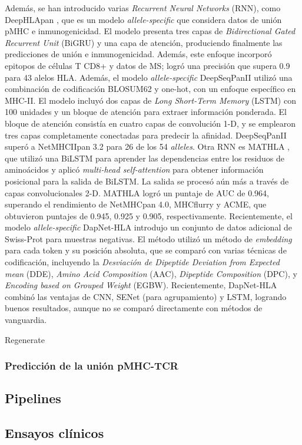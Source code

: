 Además, se han introducido varias \textit{Recurrent Neural Networks} (RNN), como DeepHLApan \citep{wu2019deephlapan}, que es un modelo \textit{allele-specific} que considera datos de unión pMHC e inmunogenicidad. El modelo presenta tres capas de \textit{Bidirectional Gated Recurrent Unit} (BiGRU) y una capa de atención, produciendo finalmente las predicciones de unión e inmunogenicidad. Además, este enfoque incorporó epitopos de células T CD8+ y datos de MS; logró una precisión que supera 0.9 para 43 alelos HLA. Además, el modelo \textit{allele-specific} DeepSeqPanII \citep{liu2021deepseqpanii} utilizó una combinación de codificación BLOSUM62 y one-hot, con un enfoque específico en MHC-II. El modelo incluyó dos capas de \textit{Long Short-Term Memory} (LSTM) con 100 unidades y un bloque de atención para extraer información ponderada. El bloque de atención consistía en cuatro capas de convolución 1-D, y se emplearon tres capas completamente conectadas para predecir la afinidad. DeepSeqPanII superó a NetMHCIIpan 3.2 para 26 de los 54 \textit{alleles}. Otra RNN es MATHLA \citep{ye2021mathla}, que utilizó una BiLSTM para aprender las dependencias entre los residuos de aminoácidos y aplicó \textit{multi-head self-attention} para obtener información posicional para la salida de BiLSTM. La salida se procesó aún más a través de capas convolucionales 2-D. MATHLA logró un puntaje de AUC de 0.964, superando el rendimiento de NetMHCpan 4.0, MHCflurry y ACME, que obtuvieron puntajes de 0.945, 0.925 y 0.905, respectivamente. Recientemente, el modelo \textit{allele-specific} DapNet-HLA \citep{jing2023dapnet} introdujo un conjunto de datos adicional de Swiss-Prot para muestras negativas. El método utilizó un método de \textit{embedding} para cada token y su posición absoluta, que se comparó con varias técnicas de codificación, incluyendo la \textit{Desviación de Dipeptide Deviation from Expected mean} (DDE), \textit{Amino Acid Composition} (AAC), \textit{Dipeptide Composition} (DPC), y \textit{Encoding based on Grouped Weight} (EGBW). Recientemente, DapNet-HLA combinó las ventajas de CNN, SENet (para agrupamiento) y LSTM, logrando buenos resultados, aunque no se comparó directamente con métodos de vanguardia.





Regenerate



\subsubsection{Predicción de la unión pMHC-TCR}



\subsection{Pipelines}
\subsection{Ensayos clínicos}

